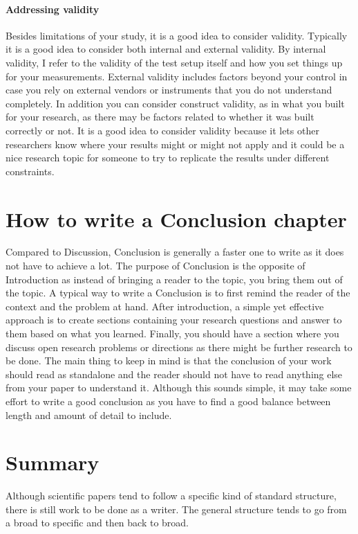 \paragraph{Addressing validity}

Besides limitations of your study, it is a good idea to consider validity.
Typically it is a good idea to consider both internal and external validity.
By internal validity, I refer to the validity of the test setup itself and how you set things up for your measurements.
External validity includes factors beyond your control in case you rely on external vendors or instruments that you do not understand completely.
In addition you can consider construct validity, as in what you built for your research, as there may be factors related to whether it was built correctly or not.
It is a good idea to consider validity because it lets other researchers know where your results might or might not apply and it could be a nice research topic for someone to try to replicate the results under different constraints.

\section{How to write a Conclusion chapter}

Compared to Discussion, Conclusion is generally a faster one to write as it does not have to achieve a lot.
The purpose of Conclusion is the opposite of Introduction as instead of bringing a reader to the topic, you bring them out of the topic.
A typical way to write a Conclusion is to first remind the reader of the context and the problem at hand.
After introduction, a simple yet effective approach is to create sections containing your research questions and answer to them based on what you learned.
Finally, you should have a section where you discuss open research problems or directions as there might be further research to be done.
The main thing to keep in mind is that the conclusion of your work should read as standalone and the reader should not have to read anything else from your paper to understand it.
Although this sounds simple, it may take some effort to write a good conclusion as you have to find a good balance between length and amount of detail to include.

\section{Summary}

Although scientific papers tend to follow a specific kind of standard structure, there is still work to be done as a writer.
The general structure tends to go from a broad to specific and then back to broad.

